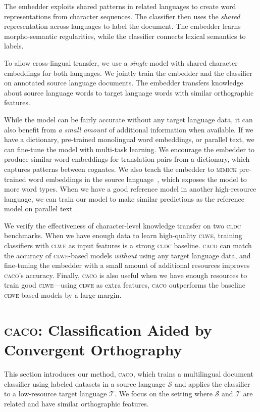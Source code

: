 \documentclass[letterpaper]{article} %
\newcommand{\citep}{\cite}
\newcommand{\abr}[1]{\textsc{#1}}
\newcommand{\name}[0]{\textsc{caco}}
\begin{document}
The embedder exploits shared patterns in related languages to
create word representations from character sequences.
The classifier then uses the \emph{shared} representation across
languages to label the document.  
The embedder learns morpho-semantic regularities, while the
classifier connects lexical semantics to labels.

To allow cross-lingual transfer, we use a \emph{single} model with shared
character embeddings for both languages.
We jointly train the embedder and the classifier on annotated source
language documents.
The embedder transfers knowledge about source language words to target language
words with similar orthographic features.

While the model can be fairly accurate without any target language data, it can
also benefit from \emph{a small amount} of additional information when
available.  If we have a dictionary, pre-trained monolingual word embeddings,
or parallel text, we can fine-tune the model with multi-task learning.
We encourage the embedder to produce similar word embeddings for translation
pairs from a dictionary, which captures patterns between cognates.
We also teach the embedder to \abr{mimick} pre-trained word embeddings
in the source language~\citep{pinter-17}, which exposes the model to
more word types.
When we have a good reference model in another high-resource language, we can
train our model to make similar predictions as the reference model on
parallel text~\citep{xu-17}.

We verify the effectiveness of character-level knowledge transfer on two
\abr{cldc} benchmarks.
When we have enough data to learn high-quality \abr{clwe}, training classifiers
with \abr{clwe} as input features is a strong \abr{cldc} baseline.
\name{} can match the accuracy of \abr{clwe}-based models \emph{without}
using any target language data, and fine-tuning the embedder with a
small amount of additional resources improves \name{}'s accuracy.
Finally, \name{} is also useful when we have enough resources to train
good \abr{clwe}---using \abr{clwe} as extra features, \name{} outperforms the
baseline \abr{clwe}-based models by a large margin.

\section{\name{}: Classification Aided by Convergent Orthography}
\label{sec:model}

This section introduces our method, \name{}, which trains a multilingual
document classifier using labeled datasets in a source language $\mathcal{S}$
and applies the classifier to a low-resource target language $\mathcal{T}$.
We focus on the setting where $\mathcal{S}$ and $\mathcal{T}$ are related and
have similar orthographic features.
\end{document}
